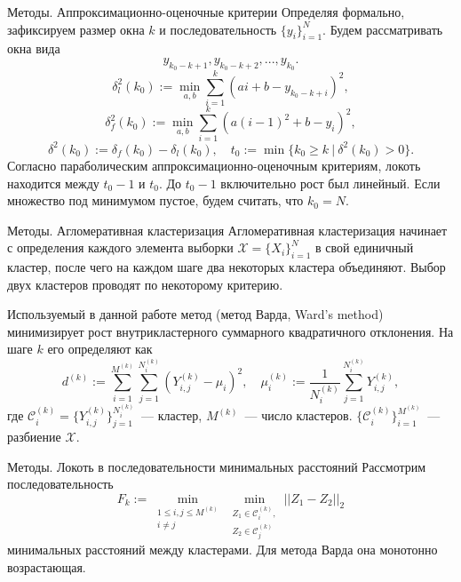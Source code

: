 \documentclass{beamer}
\begin{document}
\begin{frame}{Методы. Аппроксимационно-оценочные критерии}
  Определяя формально, зафиксируем размер окна $k$ и последовательность
  $\{y_{i}\}_{i=1}^{N}$. Будем рассматривать окна вида
  \[
    y_{k_0-k+1},y_{k_0-k+2},...,y_{k_0}.
  \]
  \[
    \delta^{2}_{l}(k_0):=\min_{a,b}\sum_{i=1}^{k}(ai+b-y_{k_0-k+i})^{2},
  \]
  \[
    \delta^{2}_{f}(k_0):=\min_{a,b}\sum_{i=1}^{k}(a(i-1)^{2}+b-y_{i})^{2},
  \]
  \[
    \delta^{2}(k_0):=\delta_{f}(k_0)-\delta_{l}(k_0),
    \quad
    t_0:=\min\{k_0\geq k~|~\delta^{2}(k_0)>0\}.
  \]
  Согласно параболическим аппроксимационно-оценочным критериям, локоть
  находится между $t_0-1$ и $t_0$. До $t_0-1$ включительно рост был линейный.
  Если множество под минимумом пустое, будем считать, что $k_0=N$.
\end{frame}

\begin{frame}{Методы. Агломеративная кластеризация}
  Агломеративная кластеризация начинает с определения каждого элемента выборки
  $\mathcal X=\{X_{i}\}_{i=1}^{N}$ в свой единичный кластер, после чего на
  каждом шаге два некоторых кластера объединяют. Выбор двух кластеров
  проводят по некоторому критерию.

  \vfill

  Используемый в данной работе метод (метод Варда, Ward's method) минимизирует
  рост внутрикластерного суммарного квадратичного отклонения. На шаге $k$ его
  определяют как
  \[
    d^{(k)} := \sum_{i=1}^{M^{(k)}}\sum_{j=1}^{N^{(k)}_{i}}\left(Y^{(k)}_{i,j} - \mu_{i}\right)^{2},\quad
    \mu^{(k)}_{i}:=\frac{1}{N^{(k)}_{i}}\sum_{j=1}^{N^{(k)}_{i}}Y^{(k)}_{i,j},
  \]
  где $\mathcal C^{(k)}_{i}=\{Y^{(k)}_{i,j}\}_{j=1}^{N^{(k)}_{i}}$~--- кластер,
  $M^{(k)}$~--- число кластеров. $\{\mathcal
    C^{(k)}_{i}\}_{i=1}^{M^{(k)}}$~--- разбиение $\mathcal X$.
\end{frame}

\begin{frame}{Методы. Локоть в последовательности минимальных расстояний}
  Рассмотрим последовательность
  \[
    F_{k}:=\min_{\substack{1\leq i,j\leq M^{(k)}\\ i\neq j}}
    \min_{\substack{Z_1\in\mathcal C^{(k)}_{i},\\ Z_2\in\mathcal C^{(k)}_{j}}}
    ||Z_1-Z_2||_{2}
  \]
  минимальных расстояний между кластерами. Для метода Варда она монотонно возрастающая.

\end{frame}
\end{document}
